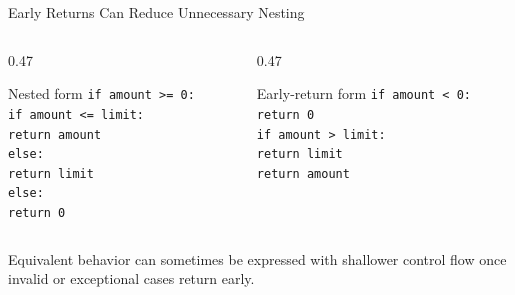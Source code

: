 \documentclass[aspectratio=169,10pt]{beamer}
\begin{document}
\begin{frame}{Early Returns Can Reduce Unnecessary Nesting}
  \begin{columns}[T,onlytextwidth]
    \begin{column}{0.47\textwidth}
      \begin{block}{Nested form}
        \texttt{if amount >= 0:}\\
        \hspace*{0.20in}\texttt{if amount <= limit:}\\
        \hspace*{0.40in}\texttt{return amount}\\
        \hspace*{0.20in}\texttt{else:}\\
        \hspace*{0.40in}\texttt{return limit}\\
        \texttt{else:}\\
        \hspace*{0.20in}\texttt{return 0}
      \end{block}
    \end{column}

    \begin{column}{0.47\textwidth}
      \begin{block}{Early-return form}
        \texttt{if amount < 0:}\\
        \hspace*{0.20in}\texttt{return 0}\\
        \texttt{if amount > limit:}\\
        \hspace*{0.20in}\texttt{return limit}\\
        \texttt{return amount}
      \end{block}
    \end{column}
  \end{columns}

  \begin{keyidea}
    Equivalent behavior can sometimes be expressed with shallower control flow once invalid or exceptional cases return early.
  \end{keyidea}
\end{frame}
\end{document}
